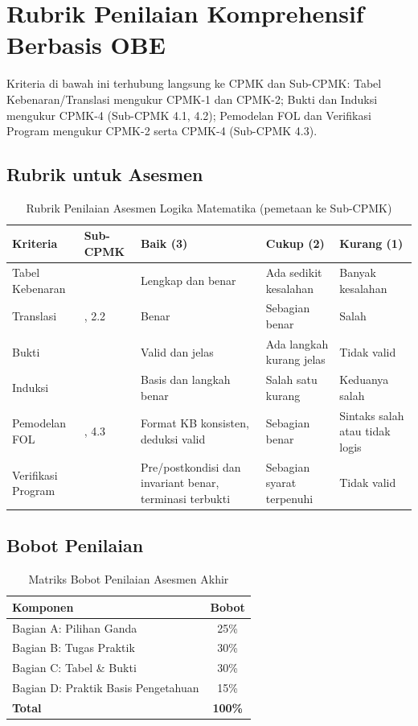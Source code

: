 \section{Rubrik Penilaian Komprehensif Berbasis OBE}

Kriteria di bawah ini terhubung langsung ke CPMK dan Sub-CPMK: Tabel Kebenaran/Translasi mengukur CPMK-1 dan CPMK-2; Bukti dan Induksi mengukur CPMK-4 (Sub-CPMK 4.1, 4.2); Pemodelan FOL dan Verifikasi Program mengukur CPMK-2 serta CPMK-4 (Sub-CPMK 4.3).

\subsection{Rubrik untuk Asesmen}

\begin{table}[htbp]
\centering
\small
\begin{tabular}{|>{\raggedright\arraybackslash}p{2.2cm}|>{\raggedright\arraybackslash}p{2.2cm}|>{\raggedright\arraybackslash}p{2.8cm}|>{\raggedright\arraybackslash}p{2.8cm}|>{\raggedright\arraybackslash}p{2.2cm}|}
\hline
\textbf{Kriteria} & \textbf{Sub-CPMK} & \textbf{Baik (3)} & \textbf{Cukup (2)} & \textbf{Kurang (1)} \\
\hline
Tabel Kebenaran & 1.2 & Lengkap dan benar & Ada sedikit kesalahan & Banyak kesalahan \\
\hline
Translasi & 2.1, 2.2 & Benar & Sebagian benar & Salah \\
\hline
Bukti & 4.1 & Valid dan jelas & Ada langkah kurang jelas & Tidak valid \\
\hline
Induksi & 4.2 & Basis dan langkah benar & Salah satu kurang & Keduanya salah \\
\hline
Pemodelan FOL & 2.3, 4.3 & Format KB konsisten, deduksi valid & Sebagian benar & Sintaks salah atau tidak logis \\
\hline
Verifikasi Program & 4.3 & Pre/postkondisi dan invariant benar, terminasi terbukti & Sebagian syarat terpenuhi & Tidak valid \\
\hline
\end{tabular}
\caption{Rubrik Penilaian Asesmen Logika Matematika (pemetaan ke Sub-CPMK)}
\end{table}

\subsection{Bobot Penilaian}

\begin{table}[htbp]
\centering
\begin{tabular}{|l|c|}
\hline
\textbf{Komponen} & \textbf{Bobot} \\
\hline
Bagian A: Pilihan Ganda & 25\% \\
\hline
Bagian B: Tugas Praktik & 30\% \\
\hline
Bagian C: Tabel \& Bukti & 30\% \\
\hline
Bagian D: Praktik Basis Pengetahuan & 15\% \\
\hline
\textbf{Total} & \textbf{100\%} \\
\hline
\end{tabular}
\caption{Matriks Bobot Penilaian Asesmen Akhir}
\end{table}
